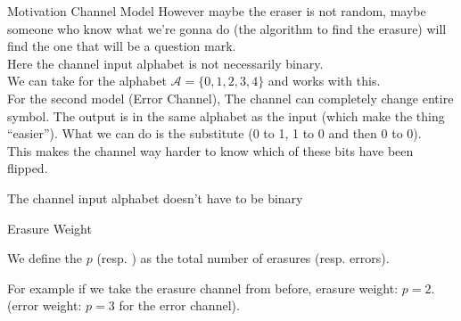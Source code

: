 \begin{parag}{Motivation Channel Model}
    However maybe the eraser is not random, maybe someone who know what we're gonna do (the algorithm to find the erasure) will find the one that will be a question mark.\\
Here the channel input alphabet is not necessarily binary.\\
We can take for the alphabet $\mathcal{A} = \{0, 1, 2, 3, 4\}$ and works with this.\\
For the second model (Error Channel), The channel can completely change entire symbol. The output is in the same alphabet as the input (which make the thing ``easier''). What we can do is the substitute (0 to 1, 1 to 0 and then 0 to 0).\\
This makes the channel way harder to know which of these bits have been flipped.
\begin{framedremark}
    The channel input alphabet doesn't have to be binary
\end{framedremark}

\end{parag}
\begin{parag}{Erasure Weight}
    \begin{definition}
    We define the  $p$ (resp. ) as the total number of erasures (resp. errors).
    \end{definition}
    
    For example if we take the erasure channel from before, erasure weight: $p= 2$. (error weight: $p = 3$ for the error channel).
\end{parag}
